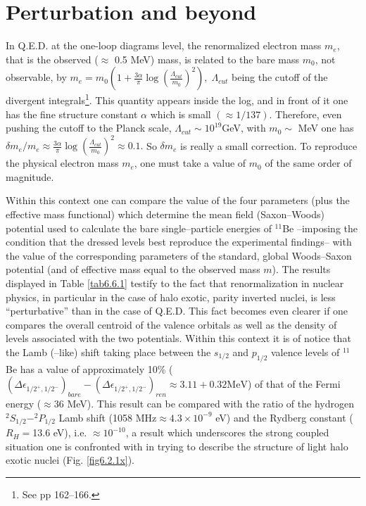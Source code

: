 \section{Perturbation and beyond}\label{S6.6}
In Q.E.D. at the one-loop diagrams level, the renormalized electron mass $m_e$, that is the observed ($\approx$ 0.5 MeV) mass, is related to the bare mass $m_0$, not observable, by $m_e=m_0\left(1+\frac{3\alpha}{\pi}\log\left(\frac{\Lambda_{cut}}{m_0}\right)^2\right), \;\Lambda_{cut}$ being the cutoff of the divergent integrals\footnote{See \cite{Bjorken:98} pp 162--166.}. This quantity appears inside the log, and in front of it one has the fine structure constant $\alpha$ which is small $(\approx1/137)$. Therefore, even pushing the cutoff to the Planck scale, $\Lambda_{cut}\sim10^{19}$GeV, with $m_0\sim$ MeV one has $\delta m_e/m_e\approx\frac{3\alpha}{\pi}\log\left(\frac{\Lambda_{cut}}{m_0}\right)^2\approx 0.1.$ So $\delta m_e$ is really a small correction. To reproduce the physical electron mass $m_e$, one must take a value of $m_0$ of the same order of magnitude. 


Within this context one can compare the value of the four parameters (plus the effective mass functional) which determine the mean field (Saxon--Woods) potential used to calculate the bare single--particle energies of $^{11}$Be --imposing the condition that the dressed levels  best reproduce the experimental findings-- with the value of the corresponding parameters of the standard, global Woods--Saxon potential (and of effective mass equal to the observed mass $m$). The results displayed in Table \ref{tab6.6.1} testify to the fact that renormalization in nuclear physics, in particular in the case of halo exotic, parity inverted nuclei, is less ``perturbative'' than in the case of Q.E.D. This fact becomes even clearer if one compares the overall centroid of the valence orbitals as well as the density of levels associated with the two potentials. Within this context it is of notice that the Lamb (--like) shift taking place between the $s_{1/2}$ and $p_{1/2}$ valence levels of $^{11}$Be has a value of approximately 10\% ($(\Delta\epsilon_{1/2^+,1/2^-})_{bare}-(\Delta\epsilon_{1/2^+,1/2^-})_{ren}\approx3.11+0.32\text{MeV}$) of that of the Fermi energy ($\approx36$ MeV). This result can be compared with the ratio of the hydrogen $^2S_{1/2}-^2P_{1/2}$ Lamb shift (1058 MHz$\approx4.3\times10^{-9}$ eV) and the Rydberg constant ($R_H=$13.6 eV), i.e. $\approx10^{-10}$, a result which underscores the strong coupled situation one is confronted with in trying to describe the structure of light halo exotic nuclei (Fig. \ref{fig6.2.1x}).

